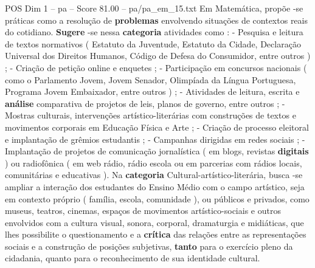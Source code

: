 \begin{textsample}{POS Dim 1 – pa – Score 81.00 – pa/pa\_em\_15.txt}
Em Matemática, propõe -se práticas como a resolução de \textbf{problemas} envolvendo situações de contextos reais do cotidiano. \textbf{Sugere} -se nessa \textbf{categoria} atividades como : - Pesquisa e leitura de textos normativos ( Estatuto da Juventude, Estatuto da Cidade, Declaração Universal dos Direitos Humanos, Código de Defesa do Consumidor, entre outros ) ; - Criação de petição online e enquetes ; - Participação em concursos nacionais ( como o Parlamento Jovem, Jovem Senador, Olimpíada da Língua Portuguesa, Programa Jovem Embaixador, entre outros ) ; - Atividades de leitura, escrita e \textbf{análise} comparativa de projetos de leis, planos de governo, entre outros ; - Mostras culturais, intervenções artístico-literárias com construções de textos e movimentos corporais em Educação Física e Arte ; - Criação de processo eleitoral e implantação de grêmios estudantis ; - Campanhas dirigidas em redes sociais ; - Implantação de projetos de comunicação jornalística ( em blogs, revistas \textbf{digitais} ) ou radiofônica ( em web rádio, rádio escola ou em parcerias com rádios locais, comunitárias e educativas ).
Na \textbf{categoria} Cultural-artístico-literária, busca -se ampliar a interação dos estudantes do Ensino Médio com o campo artístico, seja em contexto próprio ( família, escola, comunidade ), ou públicos e privados, como museus, teatros, cinemas, espaços de movimentos artístico-sociais e outros envolvidos com a cultura visual, sonora, corporal, dramaturgia e midiáticas, que lhes possibilite o questionamento e a \textbf{crítica} das relações entre as representações sociais e a construção de posições subjetivas, \textbf{tanto} para o exercício pleno da cidadania, quanto para o reconhecimento de sua identidade cultural.

\end{textsample}
